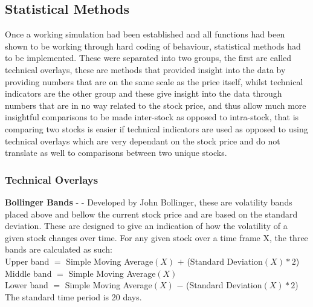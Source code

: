 \documentclass[conference]{IEEEtran}
\begin{document}
\iffalse
#################################################################################
\fi

\subsection{Statistical Methods}

Once a working simulation had been established and all functions had been shown to be working through hard coding of behaviour, statistical methods had to be implemented. These were separated into two groups, the first are called technical overlays, these are methods that provided insight into the data by providing numbers that are on the same scale as the price itself, whilst technical indicators are the other group and these give insight into the data through numbers that are in no way related to the stock price, and thus allow much more insightful comparisons to be made inter-stock as opposed to intra-stock, that is comparing two stocks is easier if technical indicators are used as opposed to using technical overlays which are very dependant on the stock price and do not translate as well to comparisons between two unique stocks. \\

\iffalse
#################################################################################
\fi

\subsubsection{Technical Overlays}

\textbf{Bollinger Bands} - \cite{Bollinger1992} - Developed by John Bollinger, these are volatility bands placed above and bellow the current stock price and are based on the standard deviation. These are designed to give an indication of how the volatility of a given stock changes over time. For any given stock over a time frame X, the three bands are calculated as such:\\

\noindent
Upper band $=$ Simple Moving Average$(X)$ $+$ (Standard Deviation$(X) * 2$)\\
Middle band $=$ Simple Moving Average$(X)$\\
Lower band $=$ Simple Moving Average$(X)$ $-$ (Standard Deviation$(X) * 2$)\\
The standard time period is 20 days.\\

\iffalse
[]
\fi
\end{document}

